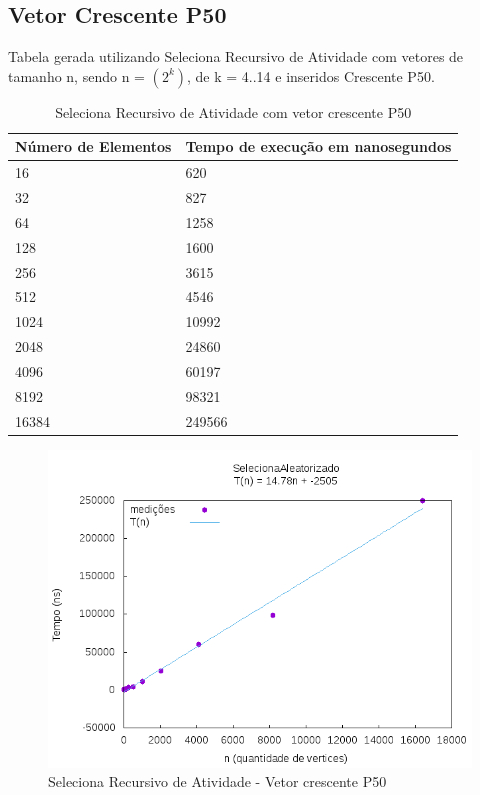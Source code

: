 \documentclass[12pt,a4paper,twoside]{report}
\begin{document}
\subsection{Vetor Crescente P50}
Tabela gerada utilizando Seleciona Recursivo de Atividade com vetores de tamanho n, sendo n = $(2^k)$, de k = 4..14 e inseridos Crescente P50.
\begin{table}[H]
\centering
\caption{Seleciona Recursivo de Atividade com vetor crescente P50}
\label{my-label}
\begin{tabular}{|l|l|}
\hline
\multicolumn{1}{|c|}{\textbf{Número de Elementos}} & \multicolumn{1}{c|}{\textbf{Tempo de execução em nanosegundos}} \\ \hline
16 & 620 \\ \hline
32 & 827 \\ \hline
64 & 1258 \\ \hline
128 & 1600 \\ \hline
256 & 3615 \\ \hline
512 & 4546 \\ \hline
1024 & 10992 \\ \hline
2048 & 24860 \\ \hline
4096 & 60197 \\ \hline
8192 & 98321 \\ \hline
16384 & 249566 \\ \hline

\end{tabular}
\end{table}

\begin{figure}[H]
    \centering
    \includegraphics[width=0.7\linewidth]{graficos/SeletorRecursivoAtividades/Crescente P50/SelecionaAleatorizado.png}
  \caption{Seleciona Recursivo de Atividade - Vetor crescente P50}
\end{figure}
\end{document}
